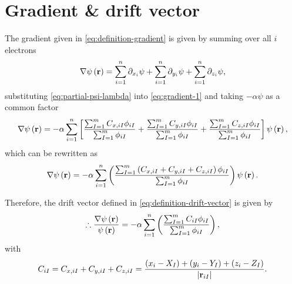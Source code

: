 \section{Gradient \& drift vector}
The gradient given in \cref{eq:definition-gradient} is given by summing
over all $i$ electrons 
\begin{equation} \label{eq:gradient-1}
    \nabla \psi \left( \boldsymbol{\mathrm{r}} \right)
    =
    \sum_{i=1}^{n} \partial_{x_i} \psi +
    \sum_{i=1}^{n} \partial_{y_i} \psi +
    \sum_{i=1}^{n} \partial_{z_i} \psi
    ,
\end{equation}
substituting \cref{eq:partial-psi-lambda}
into \cref{eq:gradient-1} and taking $-\alpha \psi$ as a common factor
\begin{equation}
    \nabla \psi \left( \boldsymbol{\mathrm{r}} \right)
    =
    -\alpha
    \sum_{i=1}^{n} 
    \left[
        \frac{
            \sum_{I=1}^{m} 
            C_{x,iI}
            \phi_{iI} 
        }{
            \sum_{I=1}^{m} \phi_{iI}
        }
        +
        \frac{
            \sum_{I=1}^{m} 
            C_{y,iI}
            \phi_{iI} 
        }{
            \sum_{I=1}^{m} \phi_{iI}
        }
        +
        \frac{
            \sum_{I=1}^{m} 
            C_{z,iI}
            \phi_{iI} 
        }{
            \sum_{I=1}^{m} \phi_{iI}
        }
    \right]
    \psi \left( \boldsymbol{\mathrm{r}} \right)
    ,
\end{equation}
which can be rewritten as
\begin{equation}
    \nabla \psi \left( \boldsymbol{\mathrm{r}} \right)
    =
    -\alpha
    \sum_{i=1}^{n} 
    \left(
        \frac{
            \sum_{I=1}^{m} 
            \left( C_{x,iI} + C_{y,iI} + C_{z,iI} \right)
            \phi_{iI} 
        }{
            \sum_{I=1}^{m} \phi_{iI}
        }
    \right)
    \psi \left( \boldsymbol{\mathrm{r}} \right)
    .
\end{equation}

Therefore, the drift vector defined in \cref{eq:definition-drift-vector} is
given by
\begin{equation} \label{eq:final-drift-vector}
    \therefore
    \frac{
        \nabla \psi \left( \boldsymbol{\mathrm{r}} \right)
    }{
        \psi \left( \boldsymbol{\mathrm{r}} \right)
    }
    =
    -\alpha
    \sum_{i=1}^{n} 
    \left(
        \frac{
            \sum_{I=1}^{m} 
            C_{iI}
            \phi_{iI} 
        }{
            \sum_{I=1}^{m} \phi_{iI}
        }
    \right)
    ,
\end{equation}
with 
\begin{equation} \label{eq:constant-CiI}
    C_{iI}
    =
    C_{x,iI} + C_{y,iI} + C_{z,iI}
    =
    \frac{
        \left( x_i - X_I \right) +
        \left( y_i - Y_I \right) +
        \left( z_i - Z_I \right)
    }{
        \left| \boldsymbol{\mathrm{r}}_{iI} \right|
    }
    .
\end{equation}

